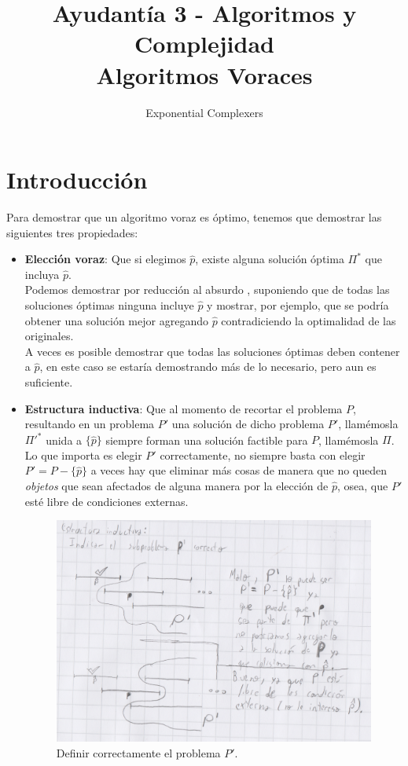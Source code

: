 \documentclass[spanish, fleqn]{article}
\title{Ayudantía 3 - Algoritmos y Complejidad\\
Algoritmos Voraces}
\author{Exponential Complexers}
\date{}
\begin{document}
\maketitle

\thispagestyle{empty}
\section{Introducción}
Para demostrar que un algoritmo voraz es óptimo, tenemos que demostrar las siguientes tres propiedades:
\begin{itemize}
\item \textbf{Elección voraz}: Que si elegimos $\hat{p}$, existe alguna solución óptima $\Pi^*$ que incluya $\hat{p}$.
\\ Podemos demostrar por reducción al absurdo , suponiendo que de todas las soluciones óptimas ninguna incluye $\hat{p}$ y mostrar, por ejemplo, que se podría obtener una solución mejor agregando $\hat{p}$ contradiciendo la optimalidad de las originales. 
\\ A veces es posible demostrar que todas las soluciones óptimas deben contener a $\hat{p}$, en este caso se estaría demostrando más de lo necesario, pero aun es suficiente.
\item \textbf{Estructura inductiva}: Que al momento de recortar el problema $P$, resultando en un problema $P'$ una solución de dicho problema $P'$, llamémosla $\Pi'^*$ unida a $\{\hat{p}\}$ siempre forman una solución factible para $P$, llamémosla $\Pi$.
\\ Lo que importa es elegir $P'$ correctamente, no siempre basta con elegir $P'=P-\{\hat{p}\}$ a veces hay que eliminar más cosas de manera que no queden \emph{objetos} que sean afectados de alguna manera por la elección de $\hat{p}$, osea, que $P'$ esté libre de condiciones externas.
\begin{figure}[H]
\centering
\includegraphics[scale=0.6]{imagen}
\caption{Definir correctamente el problema $P'$.}
\end{figure}


\end{itemize}
\end{document}
